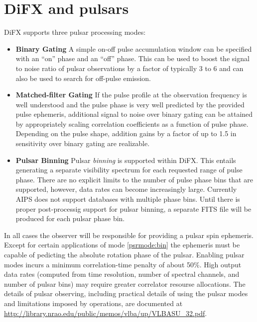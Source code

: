 \section{DiFX and pulsars} \label{sec:pulsars}





DiFX supports three pulsar processing modes:

\begin{itemize}

\item \label{psrmode:binarygate} {\bf Binary Gating}  
A simple on-off pulse accumulation window can be specified with an ``on'' phase and an ``off'' phase.
This can be used to boost the signal to noise ratio of pulsar observations by a factor of typically 3 to 6 and can also be used to search for off-pulse emission.

\item \label{psrmode:matchedgate} {\bf Matched-filter Gating}
If the pulse profile at the observation frequency is well understood and the pulse phase is very well predicted by the provided pulse ephemeris, additional signal to noise over binary gating can be attained by appropriately scaling correlation coefficients as a function of pulse phase.
Depending on the pulse shape, addition gains by a factor of up to 1.5 in sensitivity over binary gating are realizable.

\item \label{psrmode:bin} {\bf Pulsar Binning}
Pulsar {\em binning} is supported within DiFX.
This entails generating a separate visibility spectrum for each requested range of pulse phase.
There are no explicit limits to the number of pulse phase bins that are supported, however, data rates can become increasingly large.
Currently AIPS does not support databases with multiple phase bins. 
Until there is proper post-processig support for pulsar binning, a separate FITS file will be produced for each pulsar phase bin.

\end{itemize}

In all cases the observer will be responsible for providing a pulsar
spin ephemeris.  Except for certain applications of mode 
\ref{psrmode:bin} the ephemeris must be capable of pedicting the absolute
rotation phase of the pulsar.
Enabling pulsar modes incurs a minimum correlation-time penalty of
about 50\%.  High output data rates (computed from time resolution,
number of spectral channels, and number of pulsar bins) may require 
greater correlator resourse allocations.
The details of pulsar observing, including practical details of using
the pulsar modes and limitations imposed by operations, 
are documented at \url{http://library.nrao.edu/public/memos/vlba/up/VLBASU_32.pdf}.

